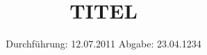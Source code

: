 

\subject{VERSUCH NUMMER}
\title{TITEL}
\date{
\centering
  Durchführung: 12.07.2011
  \hspace{3em}
  Abgabe: 23.04.1234
}



\maketitle
\thispagestyle{empty}
\tableofcontents
\newpage



%




\printbibliography


